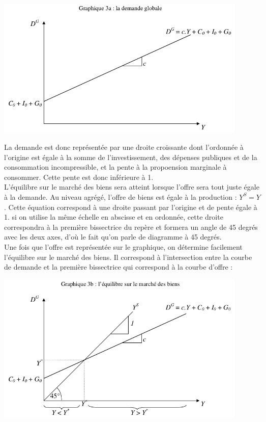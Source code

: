 \documentclass[10pt]{book}
\begin{document}
\begin{center}
  \includegraphics[width=12cm]{graph13.png}
\end{center}
La demande est donc représentée par une droite croissante dont l'ordonnée à l'origine est égale à la somme de l'investissement, des dépenses publiques et de la consommation incompressible, et la pente à la propoension marginale à consommer. Cette pente est donc inférieure à 1. \\
L'équilibre sur le marché des biens sera atteint lorsque l'offre sera tout juste égale à la demande. Au niveau agrégé, l'offre de biens est égale à la production : $Y^S = Y$. Cette équation correspond à une droite passant par l'origine et de pente égale à 1. si on utilise la même échelle en abscisse et en ordonnée, cette droite correspondra à la première bissectrice du repère et formera un angle de 45 degrés avec les deux axes, d'où le fait qu'on parle de diagramme à 45 degrés. \\
Une fois que l'offre est représentée sur le graphique, on détermine facilement l'équilibre sur le marché des biens. Il correspond à l'intersection entre la courbe de demande et la première bissectrice qui correspond à la courbe d'offre :
\begin{center}
  \includegraphics[width=12cm]{graph14.png}
\end{center}
\end{document}
